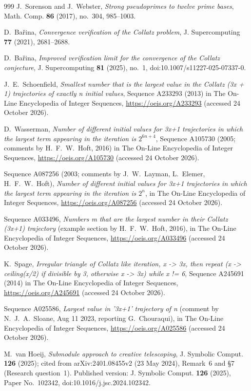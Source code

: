 \documentclass[11pt,a4paper]{article}
\theoremstyle{definition}
\theoremstyle{remark}
\numberwithin{equation}{section}
\begin{document}
\begin{thebibliography}{999}
J.~Sorenson and J.~Webster, \emph{Strong pseudoprimes to twelve prime bases}, Math. Comp. \textbf{86} (2017), no.~304, 985--1003.

D.~Ba\v{r}ina, \emph{Convergence verification of the Collatz problem}, J. Supercomputing \textbf{77} (2021), 2681--2688.

D.~Ba\v{r}ina, \emph{Improved verification limit for the convergence of the Collatz conjecture}, J. Supercomputing \textbf{81} (2025), no.~1, doi:10.1007/s11227-025-07337-0.

J.~E.~Schoenfield, \emph{Smallest number that is the largest value in the Collatz (3x + 1) trajectories of exactly n initial values}, Sequence A233293 (2013) in The On-Line Encyclopedia of Integer Sequences, \url{https://oeis.org/A233293} (accessed 24 October 2026).

D.~Wasserman, \emph{Number of different initial values for 3x+1 trajectories in which the largest term appearing in the iteration is $2^{6n+4}$}, Sequence A105730 (2005; comments by H.~F.~W.~Hoft, 2016) in The On-Line Encyclopedia of Integer Sequences, \url{https://oeis.org/A105730} (accessed 24 October 2026).

Sequence A087256 (2003; comments by J.~W.~Layman, L.~Elemer, H.~F.~W.~Hoft), \emph{Number of different initial values for 3x+1 trajectories in which the largest term appearing in the iteration is $2^n$}, in The On-Line Encyclopedia of Integer Sequences, \url{https://oeis.org/A087256} (accessed 24 October 2026).

Sequence A033496, \emph{Numbers m that are the largest number in their Collatz (3x+1) trajectory} (example section by H.~F.~W.~Hoft, 2016), in The On-Line Encyclopedia of Integer Sequences, \url{https://oeis.org/A033496} (accessed 24 October 2026).

K.~Spage, \emph{Irregular triangle of Collatz like iteration, x -> 3x, then repeat (x -> ceiling(x/2) if divisible by 3, otherwise x -> 3x) while x != 6}, Sequence A245691 (2014) in The On-Line Encyclopedia of Integer Sequences, \url{https://oeis.org/A245691} (accessed 24 October 2026).

Sequence A025586, \emph{Largest value in '3x+1' trajectory of n} (comment by N.~J.~A.~Sloane, Aug 11 2023, reporting G.~Chouraqui), in The On-Line Encyclopedia of Integer Sequences, \url{https://oeis.org/A025586} (accessed 24 October 2026).

M.~van Hoeij, \emph{Submodule approach to creative telescoping},
J. Symbolic Comput. \textbf{126} (2025); cited from arXiv:2401.08455v2
(23 May 2024), Remark~6 and \S7 (Research question~1).
Published version: J. Symbolic Comput. \textbf{126} (2025), Paper No.~102342, doi:10.1016/j.jsc.2024.102342.


\end{thebibliography}
\end{document}
